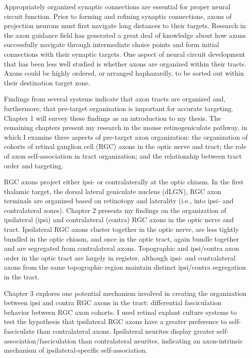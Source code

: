 Appropriately organized synaptic connections are essential for proper neural circuit function.
Prior to forming and refining synaptic connections, axons of projection neurons must first navigate long distances to their targets.
Research in the axon guidance field has generated a great deal of knowledge about how axons successfully navigate through intermediate choice points and form initial connections with their synaptic targets.
One aspect of neural circuit development that has been less well studied is whether axons are organized within their tracts.
Axons could be highly ordered, or arranged haphazardly, to be sorted out within their destination target zone.

Findings from several systems indicate that axon tracts are organized and, furthermore, that pre-target organization is important for accurate targeting.
Chapter 1 will survey these findings as an introduction to my thesis.
The remaining chapters present my research in the mouse retinogeniculate pathway, in which I examine three aspects of pre-target axon organization: the organization of cohorts of retinal ganglion cell (RGC) axons in the optic nerve and tract; the role of axon self-association in tract organization; and the relationship between tract order and targeting.

RGC axons project either ipsi- or contralaterally at the optic chiasm.
In the first thalamic target, the dorsal lateral geniculate nucleus (dLGN), RGC axon terminals are organized based on retinotopy and laterality (i.e., into ipsi- and contralateral zones).
Chapter 2 presents my findings on the organization of ipsilateral (ipsi) and contralateral (contra) RGC axons in the optic nerve and tract.
Ipsilateral RGC axons cluster together in the optic nerve, are less tightly bundled in the optic chiasm, and once in the optic tract, again bundle together and are segregated from contralateral axons.
Topographic and ipsi/contra axon order in the optic tract are largely in register, although ipsi- and contralateral axons from the same topographic region maintain distinct ipsi/contra segregation in the tract.

Chapter 3 explores one potential mechanism involved in creating the organization between ipsi and contra RGC axons in the tract: differential fasciculation behavior between RGC axon cohorts.
I used \invitro{} retinal explant culture systems to test the hypothesis that ipsilateral RGC axons have a greater preference to self-fasciculate than contralateral axons.
Ipsilateral neurites display greater self-association/fasciculation than contralateral neurites, indicating an axon-intrinsic mechanism of ipsilateral-specific self-association. 

